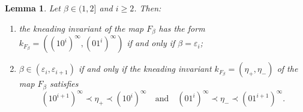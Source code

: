\documentclass[10pt,reqno]{amsart}
\theoremstyle{plain}
\theoremstyle{assumption}
\theoremstyle{notation}
\theoremstyle{claim}
\theoremstyle{conj}
\theoremstyle{theorem}
\theoremstyle{proposition}
\theoremstyle{corollary}
\newtheorem{lemma}{Lemma}[section]
\begin{document}
\begin{lemma}\label{lem:eps_knead}
    Let $\beta\in(1,2]$ and $i\geq2$. Then:
    \begin{enumerate}
    \item\label{lem:eps_knead1} the kneading invariant of the map $F_{\beta}$ has the form
    $
    k_{F_{\beta}}=((10^i)^\infty,(01^i)^\infty)
    $
    if and only if $\beta=\varepsilon_i$;
    \item\label{lem:eps_knead2} $\beta\in(\varepsilon_i,\varepsilon_{i+1})$ if and only if the kneading invariant $k_{F_{\beta}}=(\eta_+,\eta_-)$ of the map $F_{\beta}$ satisfies $$
    (10^{i+1})^\infty\prec\eta_+\prec(10^i)^\infty\quad\text{and}\quad(01^{i})^\infty\prec\eta_-\prec(01^{i+1})^\infty.
    $$
    \end{enumerate}
\end{lemma}
\end{document}
